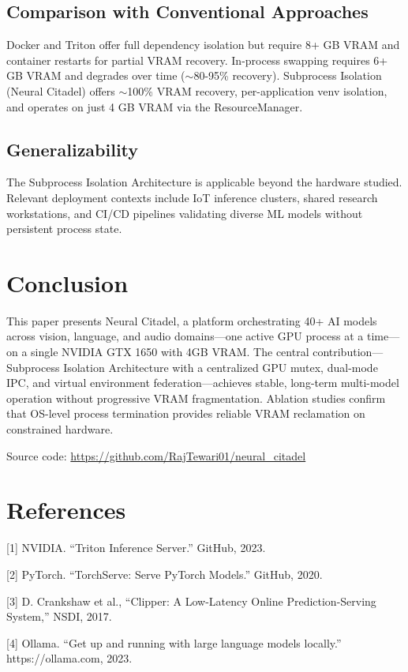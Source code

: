 \documentclass[conference]{IEEEtran}
\begin{document}
\subsection{Comparison with Conventional Approaches}
Docker and Triton offer full dependency isolation but require 8+ GB VRAM and container restarts for partial VRAM recovery. In-process swapping requires 6+ GB VRAM and degrades over time ($\sim$80-95\% recovery). Subprocess Isolation (Neural Citadel) offers $\sim$100\% VRAM recovery, per-application venv isolation, and operates on just 4 GB VRAM via the ResourceManager.

\subsection{Generalizability}
The Subprocess Isolation Architecture is applicable beyond the hardware studied. Relevant deployment contexts include IoT inference clusters, shared research workstations, and CI/CD pipelines validating diverse ML models without persistent process state.

\section{Conclusion}
This paper presents Neural Citadel, a platform orchestrating 40+ AI models across vision, language, and audio domains---one active GPU process at a time---on a single NVIDIA GTX 1650 with 4GB VRAM. The central contribution---Subprocess Isolation Architecture with a centralized GPU mutex, dual-mode IPC, and virtual environment federation---achieves stable, long-term multi-model operation without progressive VRAM fragmentation. Ablation studies confirm that OS-level process termination provides reliable VRAM reclamation on constrained hardware.

Source code: \url{https://github.com/RajTewari01/neural_citadel}

\section*{References}
[1] NVIDIA. ``Triton Inference Server.'' GitHub, 2023.

[2] PyTorch. ``TorchServe: Serve PyTorch Models.'' GitHub, 2020. 

[3] D. Crankshaw et al., ``Clipper: A Low-Latency Online Prediction-Serving System,'' NSDI, 2017.

[4] Ollama. ``Get up and running with large language models locally.'' https://ollama.com, 2023.
\end{document}
